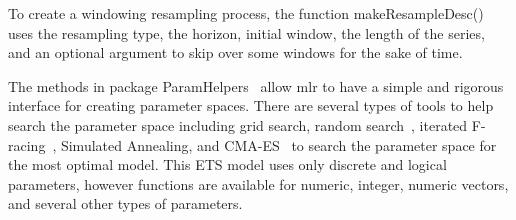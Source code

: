 \documentclass[12pt]{article}%
\makeatletter
\theoremstyle{definition}
\newcommand\code{\@codex}
\def\@codex#1{{\normalfont\ttfamily\hyphenchar\font=-1 #1}}
\newcommand{\pkg}[1]{{\fontseries{b}\selectfont #1}}
\makeatother
\begin{document}
To create a windowing resampling process, the function \code{makeResampleDesc()} uses the resampling type, the horizon, initial window, the length of the series, and an optional argument to skip over some windows for the sake of time.

\singlespacing
\begin{knitrout}
\color{fgcolor}\begin{kframe}
\begin{alltt}
 \hlkwb{=} \hlstd{(}\hlstd{,}  \hlstd{=} \hlstd{,}
                               \hlstd{=} \hlstd{,}
                               \hlstd{=} \hlstd{(}
                               \hlstd{=} \hlstd{)}
\end{alltt}


{\ttfamily\noindent\bfseries\color{errorcolor}{\#\# Error in checkClass(x, classes, ordered): object 'aaplTask' not found}}\begin{alltt}
\end{alltt}


{\ttfamily\noindent\bfseries\color{errorcolor}{\#\# Error in eval(expr, envir, enclos): object 'resampDesc' not found}}\end{kframe}
\end{knitrout}
\doublespacing

The methods in package \pkg{ParamHelpers}~\cite{paramhelper} allow \pkg{mlr} to have a simple and rigorous interface for creating parameter spaces. There are several types of tools to help search the parameter space including grid search, random search~\cite{Bergstra}, iterated F-racing~\cite{irace}, Simulated Annealing, and CMA-ES~\cite{cmaes}  to search the parameter space for the most optimal model. This ETS model uses only discrete and logical parameters, however functions are available for numeric, integer, numeric vectors, and several other types of parameters.
\end{document}
